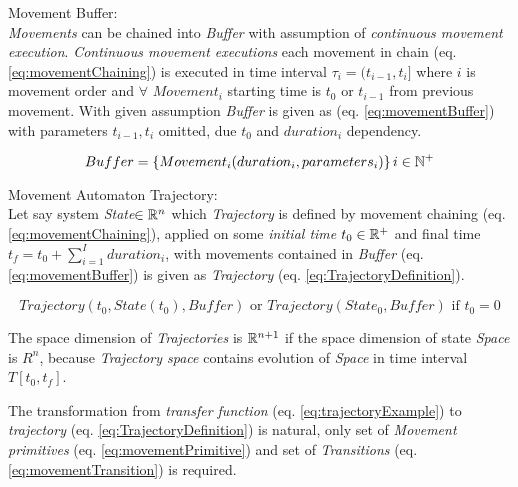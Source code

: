     \begin{definition}{Movement Buffer:}\label{def:MovementBuffer}\\
        \noindent\emph{Movements} can be chained into \emph{Buffer} with assumption of \emph{continuous movement execution}. \emph{Continuous movement executions} each movement in chain (eq. \ref{eq:movementChaining}) is executed in time interval $\tau_i=(t_{i-1},t_{i}]$ where $i$ is movement order and $\forall$ $Movement_i$ starting time is $t_0$ or $t_{i-1}$ from previous movement. With given assumption \emph{Buffer} is given as (eq. \ref{eq:movementBuffer}) with parameters $t_{i-1},t_{i}$ omitted, due $t_0$ and $duration_i$ dependency.
        
        \begin{equation}\label{eq:movementBuffer}
            Buffer = \left\{Movement_i(duration_i,parameters_i)\right\}i\in\mathbb{N}^+
        \end{equation}
    \end{definition}
    
    \begin{definition}{Movement Automaton Trajectory:}\label{def:MovementAutomatonTrajectory}\\
        Let say system \emph{State}$\in\mathbb{R}^n$ which \emph{Trajectory} is defined by movement chaining (eq. \ref{eq:movementChaining}), applied on some \emph{initial time} $t_0\in\mathbb{R}^+$ and final time $t_f=t_0+\sum_{i=1}^{I}duration_i$, with movements contained in \emph{Buffer} (eq. \ref{eq:movementBuffer}) is given as \emph{Trajectory} (eq. \ref{eq:TrajectoryDefinition}).
        
        \begin{equation}\label{eq:TrajectoryDefinition}
            Trajectory(t_0,State(t_0),Buffer)\text{ or } Trajectory(State_0,Buffer) \text{ if } t_0=0
        \end{equation}
    \end{definition}


    \begin{note}
        The space dimension of \emph{Trajectories} is $\mathbb{R}^{n+1}$ if the space dimension of state \emph{Space} is $R^n$, because \emph{Trajectory space} contains evolution of \emph{Space} in time interval $T[t_0,t_f]$.
        
        The transformation from \emph{transfer function} (eq. \ref{eq:trajectoryExample}) to \emph{trajectory} (eq. \ref{eq:TrajectoryDefinition}) is natural, only set of \emph{Movement primitives} (eq. \ref{eq:movementPrimitive}) and set of \emph{Transitions} (eq. \ref{eq:movementTransition}) is required.
    \end{note}

